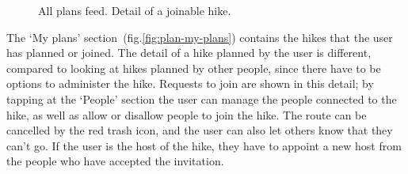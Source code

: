 \begin{figure}[h!]
    \centering
    \hfill
    \hfill
    \caption{All plans feed. Detail of a joinable hike.}
    \label{fig:plan-all-plans}
\end{figure}

The `My plans' section~(fig.\ref{fig:plan-my-plans}) contains the hikes that the user has planned or joined.
The detail of a hike planned by the user is different, compared to looking at hikes planned by other people,
since there have to be options to administer the hike.
Requests to join are shown in this detail; by tapping at the `People' section the user can manage the people connected to the hike, as well as allow or disallow people to join the hike.
The route can be cancelled by the red trash icon, and the user can also let others know that they can't go.
If the user is the host of the hike, they have to appoint a new host from the people who have accepted the invitation.

